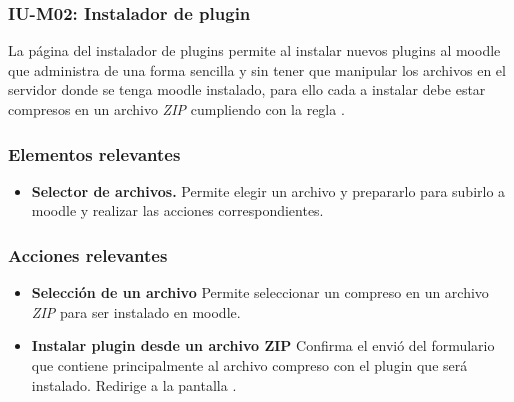 
\subsubsection{IU-M02: Instalador de plugin}

 La página del instalador de plugins permite al  instalar nuevos plugins al 
 moodle que administra de una forma sencilla y sin tener que manipular los archivos en el servidor
 donde se tenga moodle instalado, para ello cada  a instalar debe estar
 compresos en un archivo {\it ZIP} cumpliendo con la regla .


\subsubsection{Elementos relevantes}

    \begin{itemize}
    \item {\bf Selector de archivos.}
        Permite elegir un archivo y prepararlo para subirlo a moodle
        y realizar las acciones correspondientes.
    \end{itemize}

\subsubsection{Acciones relevantes}

    \begin{itemize}
    \item {\bf Selección de un archivo}
        Permite seleccionar un  compreso en un archivo {\it ZIP} para
        ser instalado en moodle.

    \item {\bf Instalar plugin desde un archivo ZIP}
        Confirma el envió del formulario que contiene principalmente al archivo compreso con 
        el plugin que será instalado. Redirige a la pantalla .
    \end{itemize}

\clearpage
